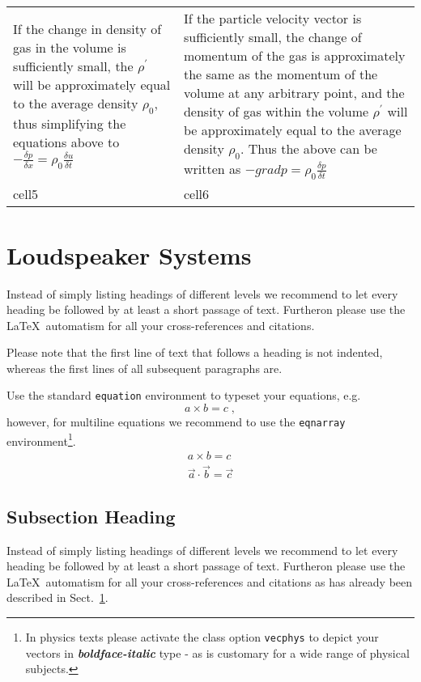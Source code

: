 \begin{center}
\begin{tabular}{|p{}|p{}|}
If the change in density of gas in the volume is sufficiently small, the $\rho^{\prime}$ will be approximately equal to the average density $\rho_0$, thus simplifying the equations above to $-\frac{\delta p}{\delta x} = \rho_0 \frac{\delta u}{\delta t}$  & If the particle velocity vector is sufficiently small, the change of momentum of the gas is approximately the same as the momentum of the volume at any arbitrary point, and the density of gas within the volume $\rho^{\prime}$ will be approximately equal to the average density $\rho_0$. Thus the above can be written as $-grad p = \rho_0 \frac{\delta p}{\delta t} $ \\ [1.5ex]
 cell5 & cell6\\ [1.5ex]
 
 \hline
\end{tabular}
\end{center}


\section{Loudspeaker Systems}
\label{sec:2}
Instead of simply listing headings of different levels we recommend to let every heading be followed by at least a short passage of text. Furtheron please use the \LaTeX\ automatism for all your cross-references and citations.

Please note that the first line of text that follows a heading is not indented, whereas the first lines of all subsequent paragraphs are.

Use the standard \verb|equation| environment to typeset your equations, e.g.
%
\begin{equation}
a \times b = c\;,
\end{equation}
%
however, for multiline equations we recommend to use the \verb|eqnarray|
environment\footnote{In physics texts please activate the class option \texttt{vecphys} to depict your vectors in \textbf{\itshape boldface-italic} type - as is customary for a wide range of physical subjects.}.
\begin{eqnarray}
a \times b = c \nonumber\\
\vec{a} \cdot \vec{b}=\vec{c}
\label{eq:01}
\end{eqnarray}

\subsection{Subsection Heading}
\label{subsec:2}
Instead of simply listing headings of different levels we recommend to let every heading be followed by at least a short passage of text. Furtheron please use the \LaTeX\ automatism for all your cross-references and citations as has already been described in Sect.~\ref{sec:2}.

